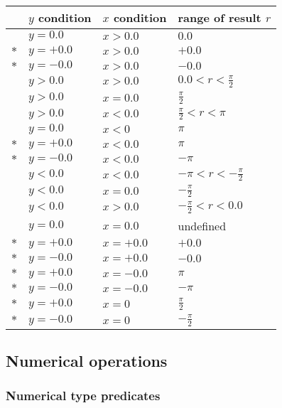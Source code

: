 \begin{center}
\begin{tabular}{clll}
& $y$ condition & $x$ condition & range of result $r$\\\hline
& $y = 0.0$ & $x > 0.0$ & $0.0$\\
$\ast$ & $y = +0.0$  & $x > 0.0$ & $+0.0$\\     
$\ast$ & $y = -0.0$ & $x > 0.0$ & $-0.0$\\
& $y > 0.0$ & $x > 0.0$ & $0.0 < r < \frac{\pi}{2}$\\
& $y > 0.0$ & $x = 0.0$ & $\frac{\pi}{2}$\\
& $y > 0.0$ & $x < 0.0$ & $\frac{\pi}{2} < r < \pi$\\
& $y = 0.0$ & $x < 0$ & $\pi$\\
$\ast$ & $y = +0.0$ & $x < 0.0$ & $\pi$\\
$\ast$ & $y = -0.0$ & $x < 0.0$ & $-\pi$\\      
&$y < 0.0$ & $x < 0.0$ & $-\pi< r< -\frac{\pi}{2}$\\
&$y < 0.0$ & $x = 0.0$ & $-\frac{\pi}{2}$\\
&$y < 0.0$ & $x > 0.0$ & $-\frac{\pi}{2} < r< 0.0$\\    
&$y = 0.0$ & $x = 0.0$ & undefined\\
$\ast$& $y = +0.0$ & $x = +0.0$ & $+0.0$\\
$\ast$& $y = -0.0$ & $x = +0.0$& $-0.0$\\
$\ast$& $y = +0.0$ & $x = -0.0$ & $\pi$\\
$\ast$& $y = -0.0$ & $x = -0.0$ & $-\pi$\\
$\ast$& $y = +0.0$ & $x = 0$ & $\frac{\pi}{2}$\\
$\ast$& $y = -0.0$ & $x = 0$    & $-\frac{\pi}{2}$
\end{tabular}
\end{center}

\subsection{Numerical operations}

\subsubsection{Numerical type predicates}

